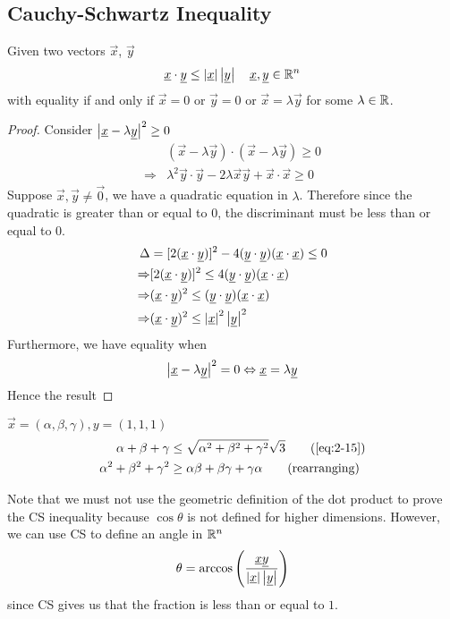 \documentclass{article}
\numberwithin{equation}{section}
\begin{document}
\subsection{Cauchy-Schwartz Inequality}
\begin{thm}[CS Inequality]
    Given two vectors $\vec{x}$, $\vec{y}$
    \begin{equation}
        \underline{x} \cdot \underline{y} \leq \left\lvert \underline{x}\right\rvert\left\lvert \underline{y}\right\rvert \quad \underline{x}, \underline{y} \in \mathbb{R}^n
    \end{equation}
    with equality if and only if $\vec{x} = 0$ or $\vec{y} = 0$ or $\vec{x} = \lambda \vec{y}$ for some $\lambda \in \mathbb{R}$.
\end{thm}
\begin{proof}
    Consider $\left\lvert \underline{x} - \lambda \underline{y}\right\rvert^2 \geq 0$
    \begin{align*}
        &(\vec{x} - \lambda \vec{y}) \cdot (\vec{x} - \lambda \vec{y}) \geq 0 \\
        \Rightarrow& \lambda^2 \vec{y} \cdot \vec{y} - 2\lambda\vec{x}\vec{y} + \vec{x} \cdot \vec{x} \geq 0
    \end{align*}
    Suppose $\vec{x}, \vec{y} \neq \vec{0}$, we have a quadratic equation in $\lambda$. Therefore since the quadratic is greater than or equal to $0$, the discriminant must be less than or equal to $0$.
    \begin{align*}
        \Delta &= [2(\underline{x} \cdot \underline{y})]^2 - 4 (\underline{y} \cdot \underline{y})(\underline{x} \cdot \underline{x}) \leq 0 \\
        \Rightarrow& [2(\underline{x} \cdot \underline{y})]^2 \leq 4 (\underline{y} \cdot \underline{y})(\underline{x} \cdot \underline{x}) \\
        \Rightarrow& (\underline{x} \cdot \underline{y})^2 \leq (\underline{y} \cdot \underline{y})(\underline{x} \cdot \underline{x}) \\
        \Rightarrow& (\underline{x} \cdot \underline{y})^2 \leq \left\lvert \underline{x}\right\rvert^2\left\lvert \underline{y}\right\rvert^2
    \end{align*}
    Furthermore, we have equality when
    \[
        \left\lvert \underline{x} - \lambda \underline{y}\right\rvert^2 = 0 \Leftrightarrow \underline{x} = \lambda \underline{y}
    \]
    Hence the result
\end{proof}

\begin{eg} $\vec{x} = (\alpha, \beta, \gamma), y = (1, 1, 1)$
    \begin{align*}
        \alpha + \beta + \gamma &\leq \sqrt{\alpha^2 + \beta^2 + \gamma^2} \sqrt{3} \tag{\ref{eq:2-15}} \\
        \alpha^2 + \beta^2 + \gamma^2 &\geq \alpha\beta + \beta\gamma + \gamma\alpha \tag{rearranging}
    \end{align*}
\end{eg}

Note that we must not use the geometric definition of the dot product to prove the CS inequality because $\cos{\theta}$ is not defined for higher dimensions. However, we can use CS to define an angle in $\mathbb{R}^n$
\[
    \theta = \arccos{\left(\frac{\underline{x}\underline{y}}{\left\lvert \underline{x}\right\rvert\left\lvert \underline{y}\right\rvert}\right)}    
\]
since CS gives us that the fraction is less than or equal to $1$.
\end{document}
